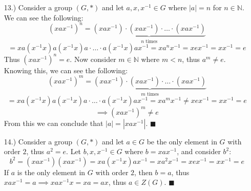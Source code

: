 \documentclass[12pt]{article}
\newcommand{\vertb}[1]{\left\vert#1\right\vert}      %
\newcommand{\parens}[1]{\left(#1\right)}             %
\newcommand{\N}{\mathbb{N}}
\begin{document}
\begin{itemize}
    \item [13.)] Consider a group $(G,*)$ and let $a,x,x^{-1}\in G$ where $\vertb{a}=n$ for $n\in\N$. We can see the following:
    \[\parens{xax^{-1}}^n=\underbrace{\parens{xax^{-1}}\cdot\parens{xax^{-1}}\cdot\ldots\cdot\parens{xax^{-1}}}_\text{$n$ times}\]
    \[=xa\parens{x^{-1}x}a\parens{x^{-1}x}a\cdot\ldots\cdot a\parens{x^{-1}x}ax^{-1}=xa^nx^{-1}=xex^{-1}=xx^{-1}=e\]
    Thus $\parens{xax^{-1}}^n=e$. Now consider $m\in\N$ where $m<n$, thus $a^m\ne e$. Knowing this, we can see the following:
    \[\parens{xax^{-1}}^m=\underbrace{\parens{xax^{-1}}\cdot\parens{xax^{-1}}\cdot\ldots\cdot\parens{xax^{-1}}}_\text{$m$ times}\]
    \[=xa\parens{x^{-1}x}a\parens{x^{-1}x}a\cdot\ldots\cdot a\parens{x^{-1}x}ax^{-1}=xa^mx^{-1}\ne xex^{-1}=xx^{-1}=e\]
    \[\implies\parens{xax^{-1}}^m\ne e\]
    From this we can conclude that $\vertb{a}=\vertb{xax^{-1}}$. $\blacksquare$

    \item [14.)] Consider a group $(G,*)$ and let $a\in G$ be the only element in $G$ with order $2$, thus $a^2=e$. Let $b,x,x^{-1}\in G$ where $b=xax^{-1}$, and consider $b^2$:
    \[b^2=\parens{xax^{-1}}\parens{xax^{-1}}=xa\parens{x^{-1}x}ax^{-1}=xa^2x^{-1}=xex^{-1}=xx^{-1}=e\]
    If $a$ is the only element in $G$ with order $2$, then $b=a$, thus $xax^{-1}=a\implies xax^{-1}x=xa=ax$, thus $a\in Z(G)$. $\blacksquare$
\end{itemize}
\end{document}
